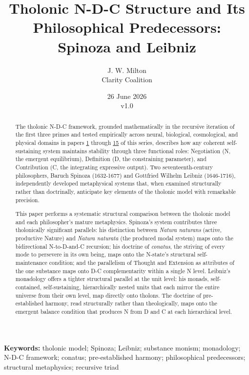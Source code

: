 \documentclass[12pt]{article}
\title{Tholonic N-D-C Structure and Its Philosophical Predecessors:\\
\large Spinoza and Leibniz}
\author{J. W. Milton\\[4pt]{\small Clarity Coalition}}
\date{\small 26 June 2026 \\ v1.0}
\begin{document}
\maketitle

\noindent\textbf{Keywords:} tholonic model; Spinoza; Leibniz; substance monism; monadology; N-D-C framework; conatus; pre-established harmony; philosophical predecessors; structural metaphysics; recursive triad

\begin{abstract}
The tholonic N-D-C framework, grounded mathematically in the recursive
iteration of the first three primes and tested empirically across
neural, biological, cosmological, and physical domains in papers
\href{https://github.com/baardev/truevalue/blob/main/docnav/Research/papers/1_recursive-tholonic-five-constants/1_recursive-tholonic-five-constants.pdf}{1}
through
\href{https://github.com/baardev/truevalue/blob/main/docnav/Research/papers/15_consciousness-dmn-d-apparatus/15_consciousness-dmn-d-apparatus.pdf}{15}
of this series, describes how any coherent self-sustaining system
maintains stability through three functional roles: Negotiation (N, the
emergent equilibrium), Definition (D, the constraining parameter), and
Contribution (C, the integrating expressive output). Two
seventeenth-century philosophers, Baruch Spinoza (1632-1677) and
Gottfried Wilhelm Leibniz (1646-1716), independently developed
metaphysical systems that, when examined structurally rather than
doctrinally, anticipate key elements of the tholonic model with
remarkable precision.

This paper performs a systematic structural comparison between the
tholonic model and each philosopher's mature metaphysics. Spinoza's
system contributes three tholonically significant parallels: his
distinction between \emph{Natura naturans} (active, productive Nature)
and \emph{Natura naturata} (the produced modal system) maps onto the
bidirectional N-to-D-and-C recursion; his doctrine of \emph{conatus},
the striving of every mode to persevere in its own being, maps onto the
N-state's structural self-maintenance condition; and the parallelism of
Thought and Extension as attributes of the one substance maps onto D-C
complementarity within a single N level. Leibniz's monadology offers a
tighter structural parallel at the unit level: his monads,
self-contained, self-sustaining, hierarchically nested units that each
mirror the entire universe from their own level, map directly onto
tholons. The doctrine of pre-established harmony, read structurally
rather than theologically, maps onto the emergent balance condition that
produces N from D and C at each hierarchical level.


\end{abstract}
\end{document}

